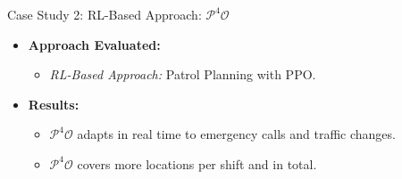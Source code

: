 \documentclass{beamer}
\begin{document}
\begin{frame}{Case Study 2: RL-Based Approach: $\mathcal{P}^4\mathcal{O}$}
  \begin{itemize}[<+->]
    \item \textbf{Approach Evaluated:}
      \begin{itemize}[<+->]
        \item \emph{RL-Based Approach:} Patrol Planning with PPO.
      \end{itemize}
    \item \textbf{Results:}
      \begin{itemize}[<+->]
        \item $\mathcal{P}^4\mathcal{O}$ adapts in real time to emergency calls and traffic changes.
        \item $\mathcal{P}^4\mathcal{O}$ covers more locations per shift and in total.
      \end{itemize}
  \end{itemize}
\end{frame}
\end{document}
